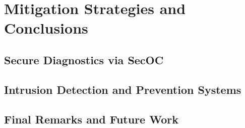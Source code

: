 \chapter{Mitigation Strategies and Conclusions}
\section{Secure Diagnostics via SecOC}
\section{Intrusion Detection and Prevention Systems}
\section{Final Remarks and Future Work}